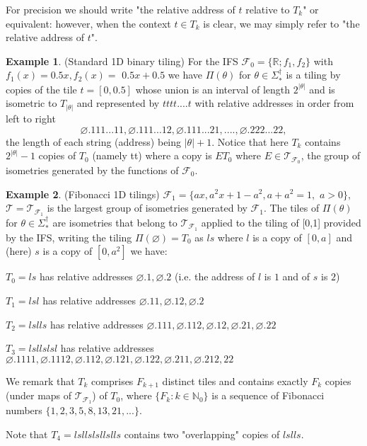 \documentclass{amsproc}
\theoremstyle{plain}
\theoremstyle{definition}
\newtheorem{example}{Example}
\numberwithin{equation}{section}
\begin{document}
For precision we should write "the relative address of $t$ relative to $%
T_{k} $" or equivalent: however, when the context $t\in T_{k}$ is clear, we
may simply refer to "the relative address of $t$".

\begin{example}
\label{ex01}(Standard 1D binary tiling) For the IFS $\mathcal{F}_{0}=\{%
\mathbb{R};f_{1},f_{2}\}$ with $f_{1}(x)=0.5x,f_{2}(x)=$ $0.5x+0.5$ we have $%
\Pi(\theta)$ for $\theta\in\Sigma_{\ast}^{\dag}$ is a tiling by copies of
the tile $t=[0,0.5]$ whose union is an interval of length $2^{\left\vert
\theta\right\vert }$ and is isometric to $T_{\left\vert \theta\right\vert }$
and represented by $tttt....t$ with relative addresses in order from left to
right 
\begin{equation*}
\varnothing.111...11,\varnothing.111...12,\varnothing
.111...21,....,\varnothing.222...22,
\end{equation*}
the length of each string (address) being $\left\vert \theta\right\vert +1.$
Notice that here $T_{k}$ contains $2^{\left\vert \theta\right\vert }-1$
copies of $T_{0}$ (namely tt) where a copy is $ET_{0}$ where $E\in\mathcal{T}%
_{\mathcal{F}_{0}}$, the group of isometries generated by the functions of $%
\mathcal{F}_{0}$.
\end{example}

\begin{example}
\label{ex02}(Fibonacci 1D tilings) $\mathcal{F}_{1}\mathcal{=\{}%
ax,a^{2}x+1-a^{2},a+a^{2}=1,$ $a>0\},$ $\mathcal{T=T}_{\mathcal{F}_{1}}$ is
the largest group of isometries generated by $\mathcal{F}_{1}$. The tiles of 
$\Pi(\theta)$ for $\theta\in\Sigma_{\ast}^{\dag}$ are isometries that belong
to $\mathcal{T}_{\mathcal{F}_{1}}$ applied to the tiling of [0,1] provided
by the IFS, writing the tiling $\Pi(\varnothing)=T_{0}$ as $ls$ where $l$ is
a copy of $[0,a]$ and (here) $s$ is a copy of $[0,a^{2}]$ we have:

$T_{0}=ls$ has relative addresses $\varnothing.1,\varnothing.2$ (i.e. the
address of $l$ is $1$ and of $s$ is $2$)

$T_{1}=lsl$ has relative addresses $\varnothing.11,\varnothing.12,%
\varnothing .2$

$T_{2}=lslls$ has relative addresses $\varnothing.111,\varnothing
.112,\varnothing.12,\varnothing.21,\varnothing.22$

$T_{3}=lsllslsl$ has relative addresses $\varnothing.1111,\varnothing
.1112,\varnothing.112,\varnothing.121,\varnothing.122,\varnothing
.211,\varnothing.212,22$

We remark that $T_{k}$ comprises $F_{k+1}$ distinct tiles and contains
exactly $F_{k}$ copies (under maps of $\mathcal{T}_{\mathcal{F}_{1}}$) of $%
T_{0}$, where $\{F_{k}:k\in\mathbb{N}_{0}\}$ is a sequence of Fibonacci
numbers $\{1,2,3,5,8,13,21,...\}$.

Note that $T_{4}=lsllslsllslls$ contains two "overlapping" copies of $lslls$.
\end{example}
\end{document}
